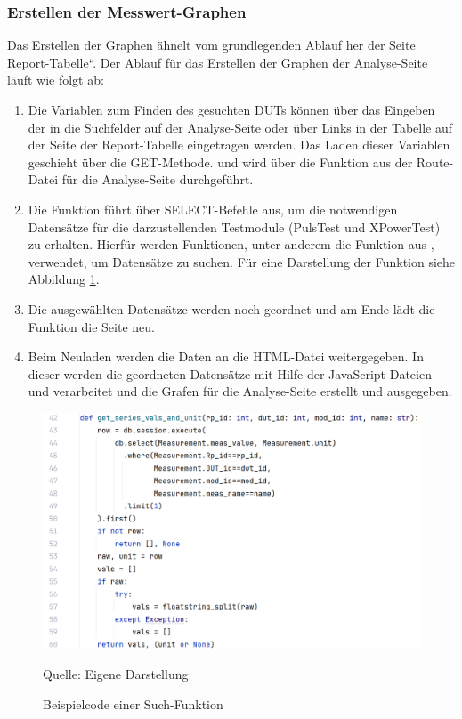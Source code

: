 \subsubsection{Erstellen der Messwert-Graphen}

Das Erstellen der Graphen ähnelt vom grundlegenden Ablauf her der Seite Report-Tabelle“.
Der Ablauf für das Erstellen der Graphen der Analyse-Seite läuft wie folgt ab:

\begin{enumerate}

    \item Die Variablen zum Finden des gesuchten \ac{DUTs} können über das Eingeben der in die Suchfelder auf der Analyse-Seite
    oder über Links in der Tabelle auf der Seite der Report-Tabelle eingetragen werden.
    Das Laden dieser Variablen geschieht über die GET-Methode.
    und wird über die Funktion  aus der Route-Datei für die Analyse-Seite durchgeführt.
    \item Die Funktion  führt über  SELECT-Befehle aus, um die notwendigen Datensätze für die darzustellenden Testmodule (PulsTest und XPowerTest) zu erhalten.
    Hierfür werden Funktionen, unter anderem die Funktion  aus , verwendet, um Datensätze zu suchen.
    Für eine Darstellung der Funktion siehe Abbildung \ref{fig:Beispielcode einer Such-Funktion}.
    \item Die ausgewählten Datensätze werden noch geordnet und am Ende lädt die Funktion die Seite neu.
    \item Beim Neuladen werden die Daten an die HTML-Datei  weitergegeben.
    In dieser werden die geordneten Datensätze mit Hilfe der JavaScript-Dateien  und  verarbeitet und die Grafen für die Analyse-Seite erstellt und ausgegeben.

\end{enumerate}

\begin{figure}[H]
    \centering
    \includegraphics[width=1\textwidth]{Grafiken/get-series.png}
    \caption{Beispielcode einer Such-Funktion}
    \label{fig:Beispielcode einer Such-Funktion}
    {Quelle: Eigene Darstellung}
\end{figure}


